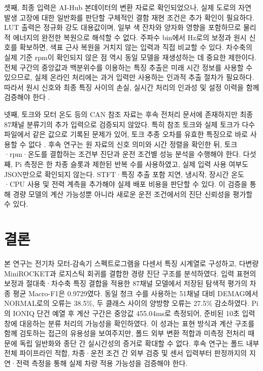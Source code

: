 \documentclass[11pt,a4paper]{article}
\newcommand{\sourceproject}{\citep{project2026}}
\begin{document}
셋째, 최종 입력은 AI-Hub 본데이터의 변환 자료로 확인되었으나, 실제 도로의 자연 발생 고장에 대한 일반화를 판단할 구체적인 결함 재현 조건은 추가 확인이 필요하다.
LUT 출력은 정규화 강도 대용값이며, 일부 색 잔차와 양자화 영향을 포함하므로 물리적 에너지의 완전한 복원으로 해석할 수 없다.
주파수 bin에서 Hz로의 보정과 원시 신호를 확보하면, 색표 근사 복원을 거치지 않는 입력과 직접 비교할 수 있다.
차수축의 실제 기준 rpm이 확인되지 않은 점 역시 동일 모델을 재생성하는 데 중요한 제한이다.
전체 구간의 중앙값과 백분위수를 이용하는 특징 추출은 미래 시간 정보를 사용할 수 있으므로, 실제 온라인 처리에는 과거 입력만 사용하는 인과적 추출 절차가 필요하다.
따라서 원시 신호와 최종 특징 사이의 손실, 실시간 처리의 인과성 및 설정 이력을 함께 검증해야 한다 \sourceproject.

넷째, 토크와 모터 온도 등의 CAN 참조 자료는 후속 전처리 문서에 존재하지만 최종 87채널 분류기의 추가 입력으로 검증되지 않았다.
특히 참조 토크와 실제 토크가 다수 파일에서 같은 값으로 기록된 문제가 있어, 토크 추종 오차를 유효한 특징으로 바로 사용할 수 없다 \sourceproject.
후속 연구는 원 자료의 신호 의미와 시간 정렬을 확인한 뒤, 토크·rpm·온도를 결합하는 조건부 진단과 운전 조건별 성능 분석을 수행해야 한다.
다섯째, Pi 측정은 한 차종 슬롯과 제한된 반복 수를 사용하였고, 실제 입력 사용 여부도 JSON만으로 확인되지 않는다.
STFT·특징 추출 포함 지연, 냉시작, 장시간 온도·CPU 사용 및 전력 계측을 추가해야 실제 배포 비용을 판단할 수 있다.
이 검증을 통해 경량 모델의 계산 가능성뿐 아니라 새로운 운전 조건에서의 진단 신뢰성을 평가할 수 있다.

\section{결론}
본 연구는 전기차 모터-감속기 스펙트로그램을 다센서 특징 시계열로 구성하고, 다변량 MiniROCKET과 로지스틱 회귀를 결합한 경량 진단 구조를 분석하였다.
입력 표현의 보정과 절대축·차수축 특징 결합을 적용한 87채널 모델에서 저장된 탐색적 평가의 차종 평균 Macro-F1은 0.9729였다.
동일 청크 수를 사용하는 51채널 대비 DEMAG에서 NORMAL로의 오류는 38.5\%, 두 클래스 사이의 양방향 오류는 27.5\% 감소하였다.
Pi의 IONIQ 단건 예열 후 계산 구간은 중앙값 455.04ms로 측정되어, 준비된 10초 입력 창에 대응하는 분류 처리의 가능성을 확인하였다.
이 성과는 표현 방식과 계산 구조를 함께 검토하는 접근의 유용성을 보여주지만, 폴드 외부 변환 적합과 미측정 전처리 때문에 독립 일반화와 종단 간 실시간성의 증거로 확대할 수 없다.
후속 연구는 폴드 내부 전체 파이프라인 적합, 차종·운전 조건 간 외부 검증 및 센서 입력부터 판정까지의 지연·전력 측정을 통해 실제 차량 적용 가능성을 검증해야 한다.
\end{document}
